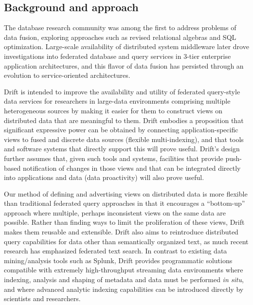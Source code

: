 \subsection{Background and approach}

The database research community was among the first to address problems of data fusion, exploring
approaches such as revised relational algebras and SQL optimization\cite{bleiholder09:_data}. Large-scale availability of
distributed system middleware later drove investigations into federated database and query
services\cite{busse99:_feder_infor_system,sheth90:_feder} in 3-tier enterprise application architectures,
and this flavor of data fusion has persisted through an evolution to service-oriented
architectures\cite{papazoglou03:_servic}.

Drift is intended to improve the availability and utility of federated query-style data services for
researchers in large-data environments comprising multiple heterogeneous sources by making it easier for
them to construct views on distributed data that are meaningful to them. Drift embodies a proposition
that significant expressive power can be obtained by connecting application-specific views to fused and
discrete data sources (flexible multi-indexing), and that tools and software systems that directly
support this will prove useful. Drift's design further assumes that, given such tools and systems,
facilities that provide push-based notification of changes in those views and that can be integrated
directly into applications and data (data proactivity) will also prove useful.

Our method of defining and advertising views on distributed data is more flexible than traditional
federated query approaches in that it encourages a “bottom-up” approach where multiple, perhaps
inconsistent views on the same data are possible. Rather than finding ways to limit the proliferation of
these views, Drift makes them reusable and extensible. Drift also aims to reintroduce distributed query
capabilities for data other than semantically organized text, as much recent research has emphasized
federated text search\cite{sparql}. In contrast to existing data mining/analysis tools such as
Splunk\cite{splunk}, Drift provides programmatic solutions compatible with extremely high-throughput
streaming data environments where indexing, analysis and shaping of metadata and data must be performed
\emph{in situ}, and where advanced analytic indexing capabilities can be introduced directly by scientists and
researchers.


